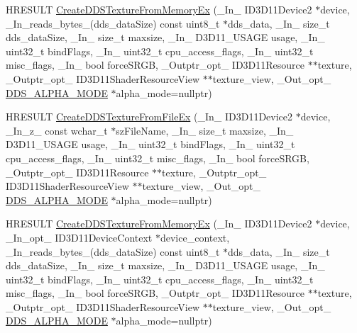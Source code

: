 \begin{DoxyCompactItemize}
\item 
H\+R\+E\+S\+U\+LT \hyperlink{namespacemage_a7102f0f3479074447a084e95bce3cc14}{Create\+D\+D\+S\+Texture\+From\+Memory\+Ex} (\+\_\+\+In\+\_\+ I\+D3\+D11\+Device2 $\ast$device, \+\_\+\+In\+\_\+reads\+\_\+bytes\+\_\+(dds\+\_\+data\+Size) const uint8\+\_\+t $\ast$dds\+\_\+data, \+\_\+\+In\+\_\+ size\+\_\+t dds\+\_\+data\+Size, \+\_\+\+In\+\_\+ size\+\_\+t maxsize, \+\_\+\+In\+\_\+ D3\+D11\+\_\+\+U\+S\+A\+GE usage, \+\_\+\+In\+\_\+ uint32\+\_\+t bind\+Flags, \+\_\+\+In\+\_\+ uint32\+\_\+t cpu\+\_\+access\+\_\+flags, \+\_\+\+In\+\_\+ uint32\+\_\+t misc\+\_\+flags, \+\_\+\+In\+\_\+ bool force\+S\+R\+GB, \+\_\+\+Outptr\+\_\+opt\+\_\+ I\+D3\+D11\+Resource $\ast$$\ast$texture, \+\_\+\+Outptr\+\_\+opt\+\_\+ I\+D3\+D11\+Shader\+Resource\+View $\ast$$\ast$texture\+\_\+view, \+\_\+\+Out\+\_\+opt\+\_\+ \hyperlink{namespacemage_a0c586a2bad862f4858900ca121ca80c2}{D\+D\+S\+\_\+\+A\+L\+P\+H\+A\+\_\+\+M\+O\+DE} $\ast$alpha\+\_\+mode=nullptr)
\item 
H\+R\+E\+S\+U\+LT \hyperlink{namespacemage_ae578f902db78efb1e9466399d72fbdbd}{Create\+D\+D\+S\+Texture\+From\+File\+Ex} (\+\_\+\+In\+\_\+ I\+D3\+D11\+Device2 $\ast$device, \+\_\+\+In\+\_\+z\+\_\+ const wchar\+\_\+t $\ast$sz\+File\+Name, \+\_\+\+In\+\_\+ size\+\_\+t maxsize, \+\_\+\+In\+\_\+ D3\+D11\+\_\+\+U\+S\+A\+GE usage, \+\_\+\+In\+\_\+ uint32\+\_\+t bind\+Flags, \+\_\+\+In\+\_\+ uint32\+\_\+t cpu\+\_\+access\+\_\+flags, \+\_\+\+In\+\_\+ uint32\+\_\+t misc\+\_\+flags, \+\_\+\+In\+\_\+ bool force\+S\+R\+GB, \+\_\+\+Outptr\+\_\+opt\+\_\+ I\+D3\+D11\+Resource $\ast$$\ast$texture, \+\_\+\+Outptr\+\_\+opt\+\_\+ I\+D3\+D11\+Shader\+Resource\+View $\ast$$\ast$texture\+\_\+view, \+\_\+\+Out\+\_\+opt\+\_\+ \hyperlink{namespacemage_a0c586a2bad862f4858900ca121ca80c2}{D\+D\+S\+\_\+\+A\+L\+P\+H\+A\+\_\+\+M\+O\+DE} $\ast$alpha\+\_\+mode=nullptr)
\item 
H\+R\+E\+S\+U\+LT \hyperlink{namespacemage_a1325dd45fa581827025d0207029bb7f0}{Create\+D\+D\+S\+Texture\+From\+Memory\+Ex} (\+\_\+\+In\+\_\+ I\+D3\+D11\+Device2 $\ast$device, \+\_\+\+In\+\_\+opt\+\_\+ I\+D3\+D11\+Device\+Context $\ast$device\+\_\+context, \+\_\+\+In\+\_\+reads\+\_\+bytes\+\_\+(dds\+\_\+data\+Size) const uint8\+\_\+t $\ast$dds\+\_\+data, \+\_\+\+In\+\_\+ size\+\_\+t dds\+\_\+data\+Size, \+\_\+\+In\+\_\+ size\+\_\+t maxsize, \+\_\+\+In\+\_\+ D3\+D11\+\_\+\+U\+S\+A\+GE usage, \+\_\+\+In\+\_\+ uint32\+\_\+t bind\+Flags, \+\_\+\+In\+\_\+ uint32\+\_\+t cpu\+\_\+access\+\_\+flags, \+\_\+\+In\+\_\+ uint32\+\_\+t misc\+\_\+flags, \+\_\+\+In\+\_\+ bool force\+S\+R\+GB, \+\_\+\+Outptr\+\_\+opt\+\_\+ I\+D3\+D11\+Resource $\ast$$\ast$texture, \+\_\+\+Outptr\+\_\+opt\+\_\+ I\+D3\+D11\+Shader\+Resource\+View $\ast$$\ast$texture\+\_\+view, \+\_\+\+Out\+\_\+opt\+\_\+ \hyperlink{namespacemage_a0c586a2bad862f4858900ca121ca80c2}{D\+D\+S\+\_\+\+A\+L\+P\+H\+A\+\_\+\+M\+O\+DE} $\ast$alpha\+\_\+mode=nullptr)

\end{DoxyCompactItemize}
